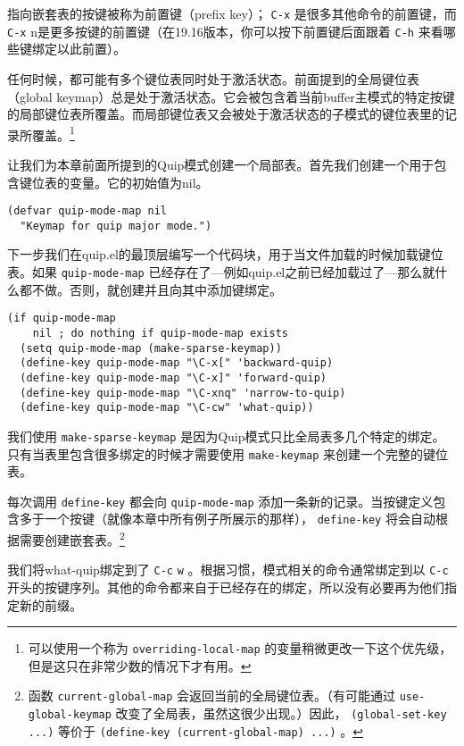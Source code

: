 指向嵌套表的按键被称为前置键（prefix key）； \verb|C-x| 是很多其他命令的前置键，而 \verb|C-x| n是更多按键的前置键（在19.16版本，你可以按下前置键后面跟着 \verb|C-h| 来看哪些键绑定以此前置）。

任何时候，都可能有多个键位表同时处于激活状态。前面提到的全局键位表（global keymap）总是处于激活状态。它会被包含着当前buffer主模式的特定按键的局部键位表所覆盖。而局部键位表又会被处于激活状态的子模式的键位表里的记录所覆盖。\footnote{可以使用一个称为 \texttt{overriding-local-map} 的变量稍微更改一下这个优先级，但是这只在非常少数的情况下才有用。}

让我们为本章前面所提到的Quip模式创建一个局部表。首先我们创建一个用于包含键位表的变量。它的初始值为nil。

\begin{verbatim}
(defvar quip-mode-map nil
  "Keymap for quip major mode.")
\end{verbatim}

下一步我们在quip.el的最顶层编写一个代码块，用于当文件加载的时候加载键位表。如果 \texttt{quip-mode-map} 已经存在了---例如quip.el之前已经加载过了---那么就什么都不做。否则，就创建并且向其中添加键绑定。

\begin{verbatim}
(if quip-mode-map
    nil ; do nothing if quip-mode-map exists
  (setq quip-mode-map (make-sparse-keymap))
  (define-key quip-mode-map "\C-x[" 'backward-quip)
  (define-key quip-mode-map "\C-x]" 'forward-quip)
  (define-key quip-mode-map "\C-xnq" 'narrow-to-quip)
  (define-key quip-mode-map "\C-cw" 'what-quip))
\end{verbatim}

我们使用 \texttt{make-sparse-keymap} 是因为Quip模式只比全局表多几个特定的绑定。只有当表里包含很多绑定的时候才需要使用 \texttt{make-keymap} 来创建一个完整的键位表。

每次调用 \texttt{define-key} 都会向 \texttt{quip-mode-map} 添加一条新的记录。当按键定义包含多于一个按键（就像本章中所有例子所展示的那样）， \texttt{define-key} 将会自动根据需要创建嵌套表。\footnote{函数 \texttt{current-global-map} 会返回当前的全局键位表。（有可能通过 \texttt{use-global-keymap} 改变了全局表，虽然这很少出现。）因此， \texttt{(global-set-key ...)} 等价于 \texttt{(define-key (current-global-map) ...)} 。}

我们将what-quip绑定到了 \verb|C-c| \verb|w| 。根据习惯，模式相关的命令通常绑定到以 \verb|C-c| 开头的按键序列。其他的命令都来自于已经存在的绑定，所以没有必要再为他们指定新的前缀。

